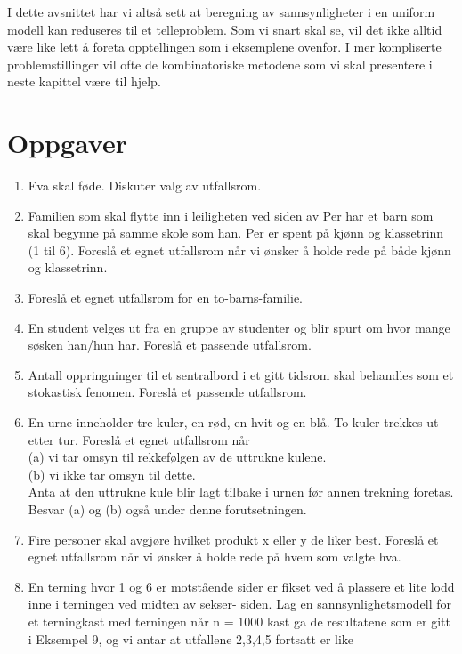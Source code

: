I dette avsnittet har vi altså sett at beregning av
sannsynligheter i en uniform modell kan reduseres til et
telleproblem. Som vi snart skal se, vil det ikke alltid være like
lett å foreta opptellingen som i eksemplene ovenfor. I mer
kompliserte problemstillinger vil ofte de kombinatoriske metodene
som vi skal presentere i neste kapittel være til hjelp.


\section{Oppgaver}
\small
\begin{enumerate}
\item  Eva skal føde. Diskuter valg av utfallsrom.
\item  Familien som skal flytte inn i leiligheten ved siden av Per
     har et barn som skal begynne på samme skole som han. Per er
     spent på kjønn og klassetrinn (1 til 6). Foreslå et egnet
     utfallsrom når vi ønsker å holde rede på både kjønn      og klassetrinn.
\item  Foreslå et egnet utfallsrom for en to-barns-familie.
\item  En student velges ut fra en gruppe av studenter og blir
     spurt om hvor mange søsken han/hun har. Foreslå et passende
     utfallsrom.
\item  Antall oppringninger til et sentralbord i et gitt tidsrom
     skal behandles som et stokastisk fenomen. Foreslå et
     passende utfallsrom.
\item  En urne inneholder tre kuler, en rød, en hvit og en blå. To
     kuler trekkes ut etter tur. Foreslå et egnet utfallsrom når\\[1mm]
     (a)  vi tar omsyn til rekkefølgen av de uttrukne kulene.  \\
     (b)  vi ikke tar omsyn til dette.\\
     Anta at den uttrukne kule blir lagt tilbake i urnen før
     annen trekning foretas. Besvar (a) og (b) også under denne
     forutsetningen.
\item  Fire personer skal avgjøre hvilket produkt x eller y  de
     liker best. Foreslå et egnet utfallsrom når vi ønsker å
     holde rede på hvem som valgte hva.
\item  En terning hvor 1 og 6 er motstående sider er fikset ved å
     plassere et lite lodd inne i terningen ved midten av sekser-
     siden. Lag en sannsynlighetsmodell for et terningkast med
     terningen når n = 1000 kast ga de resultatene som er gitt i
     Eksempel 9, og vi antar at utfallene 2,3,4,5 fortsatt er like

\end{enumerate}
